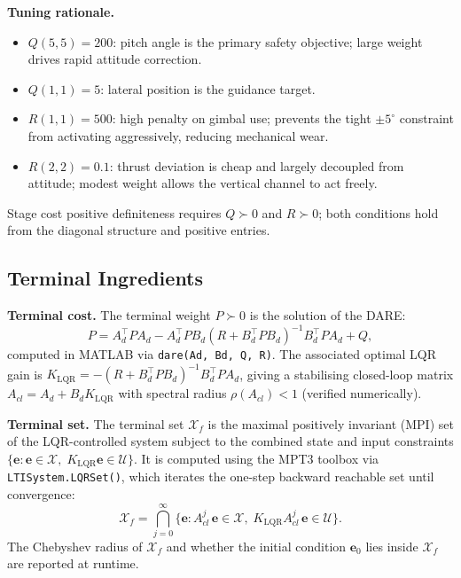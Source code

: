 \documentclass[11pt,a4paper]{article}
\newcommand{\vect}[1]{\bm{#1}}
\newcommand{\eset}{\mathcal{X}}
\newcommand{\uset}{\mathcal{U}}
\newcommand{\xf}{\mathcal{X}_f}
\begin{document}
\textbf{Tuning rationale.}
\begin{itemize}[noitemsep]
  \item $Q(5,5) = 200$: pitch angle is the primary safety objective; large weight
        drives rapid attitude correction.
  \item $Q(1,1) = 5$: lateral position is the guidance target.
  \item $R(1,1) = 500$: high penalty on gimbal use; prevents the tight
        $\pm5^{\circ}$ constraint from activating aggressively, reducing mechanical wear.
  \item $R(2,2) = 0.1$: thrust deviation is cheap and largely decoupled from
        attitude; modest weight allows the vertical channel to act freely.
\end{itemize}
Stage cost positive definiteness requires $Q \succ 0$ and $R \succ 0$; both
conditions hold from the diagonal structure and positive entries.

\subsection{Terminal Ingredients}

\textbf{Terminal cost.}
The terminal weight $P \succ 0$ is the solution of the DARE:
\begin{equation}
  P = A_d^\top P A_d - A_d^\top P B_d(R + B_d^\top P B_d)^{-1}B_d^\top P A_d + Q,
  \label{eq:dare}
\end{equation}
computed in MATLAB via \texttt{dare(Ad, Bd, Q, R)}.  The associated optimal LQR
gain is $K_{\mathrm{LQR}} = -(R + B_d^\top P B_d)^{-1}B_d^\top P A_d$, giving a
stabilising closed-loop matrix $A_{cl} = A_d + B_d K_{\mathrm{LQR}}$ with spectral
radius $\rho(A_{cl}) < 1$ (verified numerically).

\textbf{Terminal set.}
The terminal set $\xf$ is the maximal positively invariant (MPI) set of the
LQR-controlled system subject to the combined state and input constraints
$\{\vect{e}: \vect{e}\in\eset,\; K_{\mathrm{LQR}}\vect{e}\in\uset\}$.
It is computed using the MPT3 toolbox \cite{Herceg2013} via \texttt{LTISystem.LQRSet()},
which iterates the one-step backward reachable set until convergence:
\begin{equation}
  \xf = \bigcap_{j=0}^{\infty}
        \bigl\{\vect{e}: A_{cl}^j\,\vect{e} \in \eset,\;
               K_{\mathrm{LQR}}A_{cl}^j\,\vect{e} \in \uset\bigr\}.
\end{equation}
The Chebyshev radius of $\xf$ and whether the initial condition $\vect{e}_0$
lies inside $\xf$ are reported at runtime.
\end{document}
